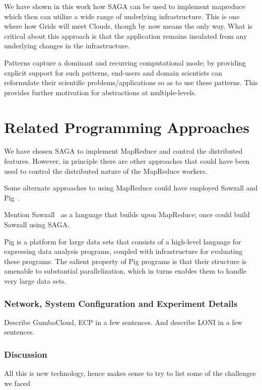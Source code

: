 \documentclass[conference,final]{IEEEtran}
\begin{document}
We have shown in this work how SAGA can be used to implement mapreduce
which then can utilize a wide range of underlying infrastructure. This
is one where how Grids will meet Clouds, though by now means the only
way. What is critical about this approach is that the application
remains insulated from any underlying changes in the infrastructure.

Patterns capture a dominant and recurring computational mode; by
providing explicit support for such patterns, end-users and domain
scientists can reformulate their scientific problems/applications so
as to use these patterns.  This provides further motivation for
abstractions at multiple-levels. 

\section*{Related Programming Approaches}

We have chosen SAGA to implement MapReduce and control the distributed
features. However, in principle there are other approaches that could
have been used to control the distributed nature of the MapReduce
workers. 

Some alternate approaches to using MapReduce could have employed
Sawzall and Pig~\cite{pig}.

Mention Sawzall~\cite{sawzall} as a language that builds upon
MapReduce; once could build Sawzall using SAGA.

Pig is a platform for large data sets that consists of a high-level
language for expressing data analysis programs, coupled with
infrastructure for evaluating these programs. The salient property of
Pig programs is that their structure is amenable to substantial
parallelization, which in turns enables them to handle very large data
sets.



\subsubsection*{Network, System Configuration and Experiment Details}

Describe GumboCloud, ECP in a few sentences.  And describe LONI in a
few sentences.

\subsubsection*{Discussion}

All this is new technology, hence makes sense to try to list some of
the challenges we faced
\end{document}
